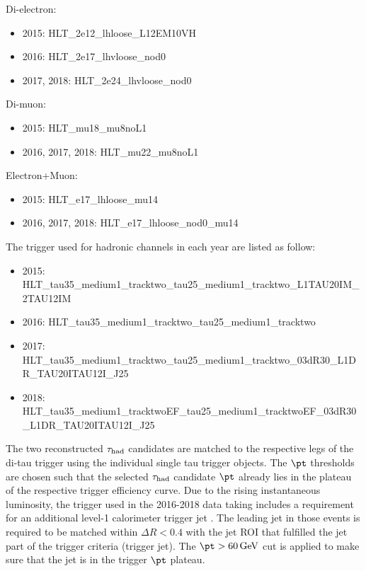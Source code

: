 Di-electron:

\begin{itemize}
\item 2015: HLT\_2e12\_lhloose\_L12EM10VH
\item 2016: HLT\_2e17\_lhvloose\_nod0
\item 2017, 2018: HLT\_2e24\_lhvloose\_nod0
\end{itemize}

Di-muon:

\begin{itemize}
\item 2015: HLT\_mu18\_mu8noL1
\item 2016, 2017, 2018: HLT\_mu22\_mu8noL1
\end{itemize}

Electron+Muon:

\begin{itemize}
\item 2015: HLT\_e17\_lhloose\_mu14
\item 2016, 2017, 2018: HLT\_e17\_lhloose\_nod0\_mu14
\end{itemize}

The trigger used for hadronic channels in each year are listed as follow:
\begin{itemize}
\small
\item 2015: HLT\_tau35\_medium1\_tracktwo\_tau25\_medium1\_tracktwo\_L1TAU20IM\_2TAU12IM
\item 2016: HLT\_tau35\_medium1\_tracktwo\_tau25\_medium1\_tracktwo
\item 2017: HLT\_tau35\_medium1\_tracktwo\_tau25\_medium1\_tracktwo\_03dR30\_L1DR\_TAU20ITAU12I\_J25
\item 2018: HLT\_tau35\_medium1\_tracktwoEF\_tau25\_medium1\_tracktwoEF\_03dR30\_L1DR\_TAU20ITAU12I\_J25

 \end{itemize}

The two reconstructed $\tau_\text{had}$ candidates are matched to the respective legs of the di-tau trigger using the individual single tau trigger objects. The $\pt$ thresholds are chosen such that the selected $\tau_\text{had}$ candidate $\pt$ already lies in the plateau of the respective trigger efficiency curve. Due to the rising instantaneous luminosity, the trigger used in the 2016-2018 data taking includes a requirement for an additional level-1 calorimeter trigger jet 
. The leading jet in those events is required to be matched within $\Delta R < 0.4$ with the jet ROI that fulfilled the jet part of the trigger criteria (trigger jet). The $\pt > \SI{60}{\GeV}$ cut is applied to make sure that the jet is in the trigger $\pt$ plateau.

